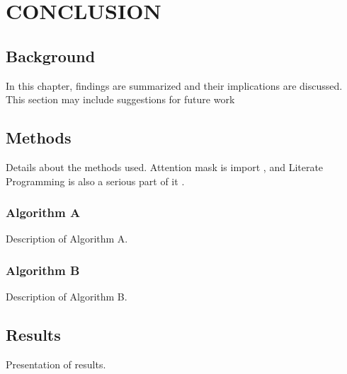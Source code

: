 \documentclass[12pt, a4paper]{report}
\begin{document}
			
			\setcounter{chapter}{8}
			\setcounter{section}{0}
			
			
			
			
			
			
			
			
			
			
			
			
			
			
			
			
			
			\chapter{\textbf{CONCLUSION}}{
				\begin{flushleft}
				\section{Background}{
					In this chapter, findings are summarized and their implications are discussed. This section may include suggestions for future work
				}
				\end{flushleft}
	
			\section{Methods}{
				Details about the methods used.
				Attention mask is import \cite{DBLP:journals/corr/VaswaniSPUJGKP17}, and Literate Programming is also a serious part of it \cite{knuth:1984}. %
		
				\subsection{Algorithm A}{
					Description of Algorithm A.
				}
				
				\subsection{Algorithm B}{
					Description of Algorithm B.
				}
			}
			
			\section{Results}{
				Presentation of results.
			}
		
	}
			
			
			
			
			
		
		
			
			
			
		
	
\end{document}

